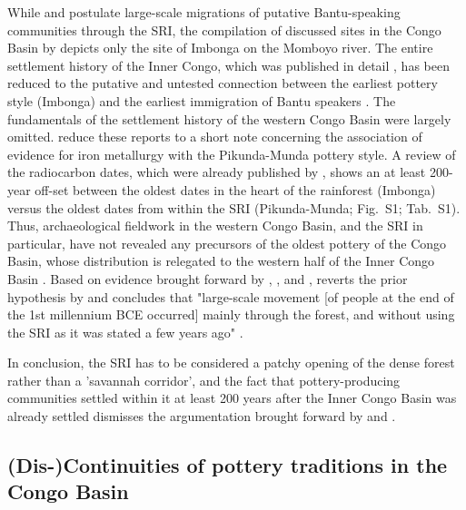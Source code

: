 \documentclass[smallextended,natbib]{svjour3}       %
\begin{document}
While \citet{Grollemund.2015} and \citet{Bostoen.2015} postulate large-scale migrations of putative Bantu-speaking communities through the SRI, the compilation of discussed sites in the Congo Basin by \citet[356 Fig.~1]{Bostoen.2015} depicts only the site of Imbonga on the Momboyo river. The entire settlement history of the Inner Congo, which was published in detail \citep{Eggert.1984,Eggert.1987a,Wotzka.1995}, has been reduced to the putative and untested connection between the earliest pottery style (Imbonga) and the earliest immigration of Bantu speakers \citep[366]{Bostoen.2015}. The fundamentals of the settlement history of the western Congo Basin \citet{Eggert.1992,Eggert.1993} were largely omitted. \citet[364]{Bostoen.2015} reduce these reports to a short note concerning the association of evidence for iron metallurgy with the Pikunda-Munda pottery style. A review of the radiocarbon dates, which were already published by \citet{Eggert.1992,Eggert.1993}, shows an at least 200-year off-set between the oldest dates in the heart of the rainforest (Imbonga) versus the oldest dates from within the SRI (Pikunda-Munda; Fig.~S1; Tab.~S1). Thus, archaeological fieldwork in the western Congo Basin, and the SRI in particular, have not revealed any precursors of the oldest pottery of the Congo Basin, whose distribution is relegated to the western half of the Inner Congo Basin \citep[220 Fig.~100A]{Seidensticker.2021e}. Based on evidence brought forward by \citet{MorinRivat.2014}, \citet{Seidensticker.2016b}, and \citet{Giresse.2020}, \citet{Clist.2022} reverts the prior hypothesis by \citep{Bostoen.2015} and concludes that "large-scale movement [of people at the end of the 1st millennium BCE occurred] mainly through the forest, and without using the SRI as it was stated a few years ago" \citep[67]{Clist.2022}. 

In conclusion, the SRI has to be considered a patchy opening of the dense forest rather than a 'savannah corridor', and the fact that pottery-producing communities settled within it at least 200 years after the Inner Congo Basin was already settled dismisses the argumentation brought forward by \citet{Grollemund.2015,Grollemund.2023} and \citet{Bostoen.2015}.

\subsection*{(Dis-)Continuities of pottery traditions in the Congo Basin}
\end{document}
